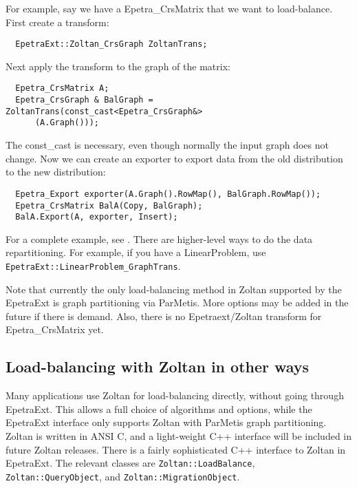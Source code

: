 For example, say we have a Epetra\_CrsMatrix that we want to load-balance.
First create a transform:
\begin{verbatim}
  EpetraExt::Zoltan_CrsGraph ZoltanTrans;
\end{verbatim}
Next apply the transform to the graph of the matrix:
\begin{verbatim}
  Epetra_CrsMatrix A;
  Epetra_CrsGraph & BalGraph = ZoltanTrans(const_cast<Epetra_CrsGraph&>
      (A.Graph()));
\end{verbatim}
The const\_cast is necessary, even though normally the input graph does not 
change.
Now we can create an exporter to export data from the old distribution 
to the new distribution:
\begin{verbatim}
  Epetra_Export exporter(A.Graph().RowMap(), BalGraph.RowMap());
  Epetra_CrsMatrix BalA(Copy, BalGraph);
  BalA.Export(A, exporter, Insert);
\end{verbatim}

For a complete example, see .
There are higher-level ways to do the data repartitioning. For example,
if you have a LinearProblem, use \verb!EpetraExt::LinearProblem_GraphTrans!.

Note that currently the only load-balancing method in Zoltan supported
by the EpetraExt is graph partitioning via ParMetis. More
options may be added in the future if there is demand. Also,
there is no Epetraext/Zoltan transform for Epetra\_CrsMatrix yet.

\subsection{Load-balancing with Zoltan in other ways}

Many applications use Zoltan for load-balancing directly, without
going through EpetraExt. This allows a full choice of algorithms
and options, while the EpetraExt interface only supports
Zoltan with ParMetis graph partitioning. Zoltan is written in ANSI C,
and a light-weight C++ interface will be included in future Zoltan
releases.  There is a fairly sophisticated
C++ interface to Zoltan in EpetraExt. The relevant classes
are \verb!Zoltan::LoadBalance!, \verb!Zoltan::QueryObject!,
and \verb!Zoltan::MigrationObject!. 

